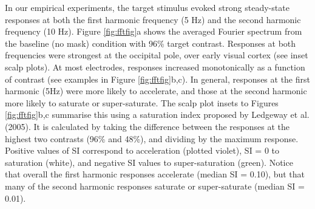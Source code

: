 \documentclass[]{article}
\begin{document}
In our empirical experiments, the target stimulus evoked strong steady-state responses at both the first harmonic frequency (5 Hz) and the second harmonic frequency (10 Hz). Figure \ref{fig:fftfig}a shows the averaged Fourier spectrum from the baseline (no mask) condition with 96\% target contrast. Responses at both frequencies were strongest at the occipital pole, over early visual cortex (see inset scalp plots). At most electrodes, responses increased monotonically as a function of contrast (see examples in Figure \ref{fig:fftfig}b,c). In general, responses at the first harmonic (5Hz) were more likely to accelerate, and those at the second harmonic more likely to saturate or super-saturate. The scalp plot insets to Figures \ref{fig:fftfig}b,c summarise this using a saturation index proposed by Ledgeway et al. (2005). It is calculated by taking the difference between the responses at the highest two contrasts (96\% and 48\%), and dividing by the maximum response. Positive values of SI correspond to acceleration (plotted violet), SI = 0 to saturation (white), and negative SI values to super-saturation (green). Notice that overall the first harmonic responses accelerate (median SI = 0.10), but that many of the second harmonic responses saturate or super-saturate (median SI = 0.01).
\end{document}
